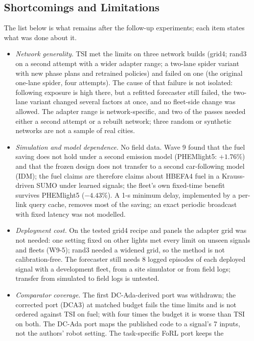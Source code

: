 \subsection{Shortcomings and Limitations}
The list below is what remains after the follow-up experiments; each item states what was done about it.
\begin{itemize}\setlength\itemsep{1pt}
\item \emph{Network generality.} TSI met the limits on three network builds (grid4; rand3 on a second attempt with a wider adapter range;
a two-lane spider variant with new phase plans and retrained policies) and failed on one (the original one-lane spider, four attempts).
The cause of that failure is not isolated: following exposure is high there, but a refitted forecaster still failed, the two-lane
variant changed several factors at once, and no fleet-side change was allowed. The
adapter range is network-specific, and two of the passes needed either a second attempt or a rebuilt network; three random or synthetic
networks are not a sample of real cities.
\item \emph{Simulation and model dependence.} No field data. Wave 9 found that the fuel saving does not hold under a second emission
model (PHEMlight5: $+1.76\%$) and that the frozen design does not transfer to a second car-following model (IDM); the fuel claims are
therefore claims about HBEFA4 fuel in a Krauss-driven SUMO under learned signals; the fleet's own fixed-time benefit survives PHEMlight5
($-4.43\%$). A 1-s minimum delay, implemented by a per-link query cache, removes most of the saving; an exact periodic broadcast with
fixed latency was not modelled.
\item \emph{Deployment cost.} On the tested grid4 recipe and panels the adapter grid was not needed: one setting fixed on other lights met
every limit on unseen signals and fleets (W9-5); rand3 needed a widened grid, so the method is not calibration-free. The forecaster still needs 8 logged episodes of each deployed signal with a development fleet, from a site simulator or
from field logs; transfer from simulated to field logs is untested.
\item \emph{Comparator coverage.} The first DC-Ada-derived port was withdrawn; the corrected port (DCA3) at matched budget fails the time limits and is not ordered against TSI on fuel; with four times the budget it is worse than TSI on both. The DC-Ada port maps the published code to a signal's 7 inputs, not the authors' robot setting. The task-specific FoRL port keeps the

\end{itemize}
